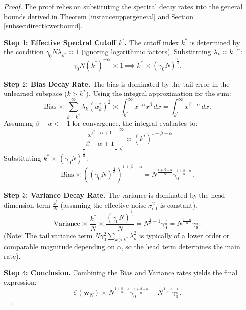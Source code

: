 \documentclass{article}
\theoremstyle{definition}
\theoremstyle{definition}
\theoremstyle{plain}
\theoremstyle{plain}
\theoremstyle{plain}
\theoremstyle{plain}
\theoremstyle{plain}
\newcommand{\bs}[1]{\boldsymbol{\mathbf{#1}}}
\newcommand{\eff}{\mathrm{eff}}
\begin{document}
\begin{proof}
    The proof relies on substituting the spectral decay rates into the general bounds derived in Theorem \ref{instanceuppergeneral} and Section \ref{subsec:directlowerbound}.

    \textbf{Step 1: Effective Spectral Cutoff $k^*$.}
    The cutoff index $k^*$ is determined by the condition $\gamma_0 N \lambda_{k^*} \asymp 1$ (ignoring logarithmic factors). Substituting $\lambda_k \asymp k^{-\alpha}$:
    \begin{equation}
        \gamma_0 N (k^*)^{-\alpha} \asymp 1 \implies k^* \asymp (\gamma_0 N)^{\frac{1}{\alpha}}.
    \end{equation}

    \textbf{Step 2: Bias Decay Rate.}
    The bias is dominated by the tail error in the unlearned subspace ($k > k^*$). Using the integral approximation for the sum:
    \begin{equation}
        \text{Bias} \asymp \sum_{k=k^*}^\infty \lambda_k (w_k^*)^2 \asymp \int_{k^*}^\infty x^{-\alpha} x^{\beta} \, dx = \int_{k^*}^\infty x^{\beta-\alpha} \, dx.
    \end{equation}
    Assuming $\beta - \alpha < -1$ for convergence, the integral evaluates to:
    \begin{equation}
        \left[ \frac{x^{\beta-\alpha+1}}{\beta-\alpha+1} \right]_{k^*}^\infty \asymp (k^*)^{1+\beta-\alpha}.
    \end{equation}
    Substituting $k^* \asymp (\gamma_0 N)^{\frac{1}{\alpha}}$:
    \begin{equation}
        \text{Bias} \asymp \left( (\gamma_0 N)^{\frac{1}{\alpha}} \right)^{1+\beta-\alpha} = N^{\frac{1+\beta-\alpha}{\alpha}} \gamma_0^{\frac{1+\beta-\alpha}{\alpha}}.
    \end{equation}

    \textbf{Step 3: Variance Decay Rate.}
    The variance is dominated by the head dimension term $\frac{k^*}{N}$ (assuming the effective noise $\sigma_\eff^2$ is constant).
    \begin{equation}
        \text{Variance} \asymp \frac{k^*}{N} \asymp \frac{(\gamma_0 N)^{\frac{1}{\alpha}}}{N} = N^{\frac{1}{\alpha}-1} \gamma_0^{\frac{1}{\alpha}} = N^{\frac{1-\alpha}{\alpha}} \gamma_0^{\frac{1}{\alpha}}.
    \end{equation}
    (Note: The tail variance term $N \gamma_0^2 \sum_{k>k^*} \lambda_k^2$ is typically of a lower order or comparable magnitude depending on $\alpha$, so the head term determines the main rate).

    \textbf{Step 4: Conclusion.}
    Combining the Bias and Variance rates yields the final expression:
    \begin{equation}
        \mathcal{E}(\bs w_N) \asymp N^{\frac{1+\beta-\alpha}{\alpha}}\gamma_0^{\frac{1+\beta-\alpha}{\alpha}} + N^{\frac{1-\alpha}{\alpha}}\gamma_0^{\frac{1}{\alpha}}.
    \end{equation}
\end{proof}
\end{document}
